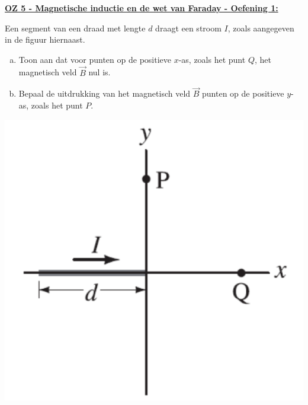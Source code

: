 \textbf{\underline{OZ 5 - Magnetische inductie en de wet van Faraday - Oefening 1:}}
\vspace{0.5cm}

\begin{minipage}{0.76\textwidth}
    Een segment van een draad met lengte $d$ draagt een stroom $I$, zoals aangegeven in de figuur hiernaast.

    \begin{enumerate}[(a)]
        \item 
            Toon aan dat voor punten op de positieve $x$-as, zoals het punt $Q$, het magnetisch veld $\Vec{B}$ nul is.
        \item 
            Bepaal de uitdrukking van het magnetisch veld $\Vec{B}$ punten op de positieve $y$-as, zoals het punt $P$.
    \end{enumerate}
\end{minipage}
\begin{minipage}{0.2\textwidth}
    \begin{center}
        \includegraphics[scale = 0.35]{oz05/resources/Oz5Oef1.png}
    \end{center}
\end{minipage}

